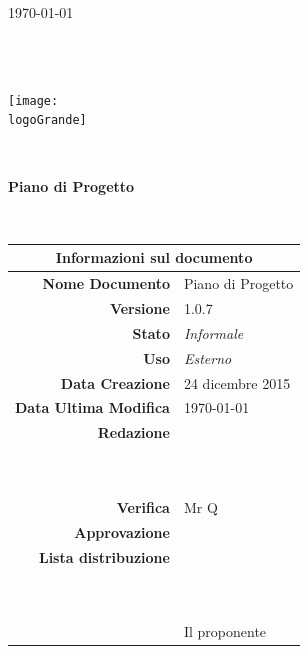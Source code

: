 \documentclass[12pt,a4paper]{article}
\title{\titoloDocumento}
\newcommand{\titoloDocumento}{Piano di Progetto}
\newcommand{\dataCreazione}{24 dicembre 2015}
\newcommand{\versione}{1.0.7}
\newcommand{\stato}{Informale}
\newcommand{\uso}{Esterno}
\begin{document}
\begin{titlepage}
\begin{center}
\today \\
\vspace{1cm}
\begin{Huge}
\textbf{\nomeGruppo} \\
\end{Huge}
\textbf{\prjL} \\
\vspace{1cm}
\texttt{[image: \\logoGrande]}
\vspace{1cm}

\HRule \\[0.4cm]
\begin{Huge}
{\huge \bfseries \titoloDocumento}\\[0.4cm]
\end{Huge}
\HRule \\[1cm]
\vfill

\begin{table}[H]
\begin{center}
\begin{tabular}{r | l}
\multicolumn{2}{c}{\textbf{Informazioni sul documento}}\\
\midrule
\textbf{Nome Documento}	&	\titoloDocumento	\\
\textbf{Versione}	&	\versione	\\
\textbf{Stato}	&	\emph{\stato}	\\
\textbf{Uso}	&	\emph{\uso}	\\
\textbf{Data Creazione}	&	\dataCreazione	\\
\textbf{Data Ultima Modifica}	&	\today	\\
\textbf{Redazione}	& \NDC \\
\ 	& \TP \\
\ 	& \IB \\
\textbf{Verifica}	&	Mr Q	\\
\textbf{Approvazione}	& \NDC \\
\textbf{Lista distribuzione}	&	\nomeGruppo	\\
\ 	&	\Vardanega	\\
\ 	&	\Cardin	\\
\ 	&	Il proponente \Zucchetti	\\

\end{tabular}
\end{center}
\end{table}

\end{center}
\end{titlepage}
\newpage
\end{document}

